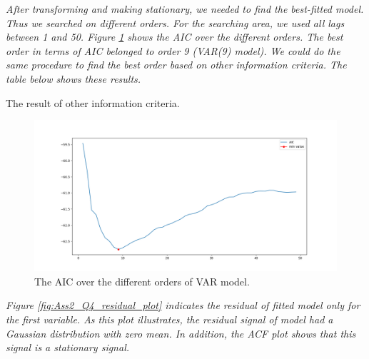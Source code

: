 \textit{After transforming and making stationary, we needed to find the best-fitted model. Thus we searched on different orders. For the searching area, we used all lags between 1 and 50. Figure \ref{fig:Ass2_Q4_AIC_plot} shows the \gls{AIC} over the different orders. The best order in terms of \gls{AIC} belonged to order 9 (VAR(9) model). We could do the same procedure to find the best order based on other information criteria. The table below shows these results.}

\begin{table}[H]
\centering
\caption{The result of other information criteria.}
\label{tab:Ass2_Q4_criteria}

\end{table}


\begin{figure}[H]
    \centering
    \begin{minipage}[b]{1\textwidth}
        \includegraphics[width=\textwidth]{manuscript/src/figures/Ass2/Ass2_Q4_AIC_plot.png}
    \end{minipage}
    \caption{The \gls{AIC} over the different orders of VAR model.}
    \label{fig:Ass2_Q4_AIC_plot}
\end{figure}

\textit{Figure \ref{fig:Ass2_Q4_residual_plot} indicates the residual of fitted model only for the first variable. As this plot illustrates, the residual signal of model had a Gaussian distribution with zero mean. In addition, the \gls{ACF} plot shows that this signal is a stationary signal.}



